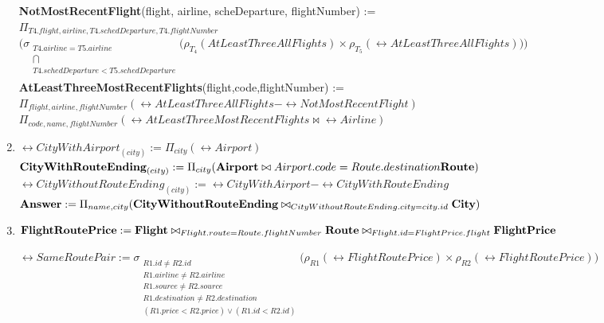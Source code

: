 \begin{enumerate}[label=\textbf{\arabic*.}]
\textbf{NotMostRecentFlight}(flight, airline, scheDeparture, flightNumber) := \\
$\Pi_{T4.flight, airline, T4.schedDeparture, T4.flightNumber}$\\$\Bigg(\sigma_{\substack{T4.airline=T5.airline \\ \bigcap \\ T4.schedDeparture < T5.schedDeparture \\}}\Bigg(\rho_{T_4}(AtLeastThreeAllFlights) \times \rho_{T_5}(\rel{AtLeastThreeAllFlights})\Bigg)\Bigg)$\\
    
\textbf{AtLeastThreeMostRecentFlights}(flight,code,flightNumber) := \\ $\Pi_{flight, airline, flightNumber}(\rel{AtLeastThreeAllFlights}-\rel{NotMostRecentFlight})$\\

$\Pi_{code,name,flightNumber}(\rel{AtLeastThreeMostRecentFlights} \bowtie \rel{Airline})$\\


\newpage
\item 

$\rel{CityWithAirport}_{(city)} := \Pi_{city}(\rel{Airport})$\\

$\textbf{CityWithRouteEnding}_{(city)} := \Pi_{city}(\textbf{Airport} \bowtie{Airport.code = Route.destination} \textbf{Route})$\\

$\rel{CityWithoutRouteEnding}_{(city)} := \rel{CityWithAirport} - \rel{CityWithRouteEnding}$\\

$\textbf{Answer} := \Pi_{name, city} (\textbf{CityWithoutRouteEnding} \bowtie_{CityWithoutRouteEnding.city = city.id} \textbf{City})$\\


\item

$\textbf{FlightRoutePrice} := \textbf{Flight} \bowtie_{Flight.route = Route.flightNumber} \textbf{Route} \bowtie_{Flight.id = FlightPrice.flight}\textbf{FlightPrice}$

$\rel{SameRoutePair} := \sigma_{
\substack{R1.id \neq R2.id \\
          R1.airline \neq R2.airline\\
          R1.source \neq R2.source\\
          R1.destination \neq R2.destination\\
          (R1.price < R2.price) \lor (R1.id < R2.id) 
          }}\Bigg( \rho_{R1}(\rel{FlightRoutePrice}) \times  \rho_{R2}(\rel{FlightRoutePrice}) \Bigg)$\\


\end{enumerate}
